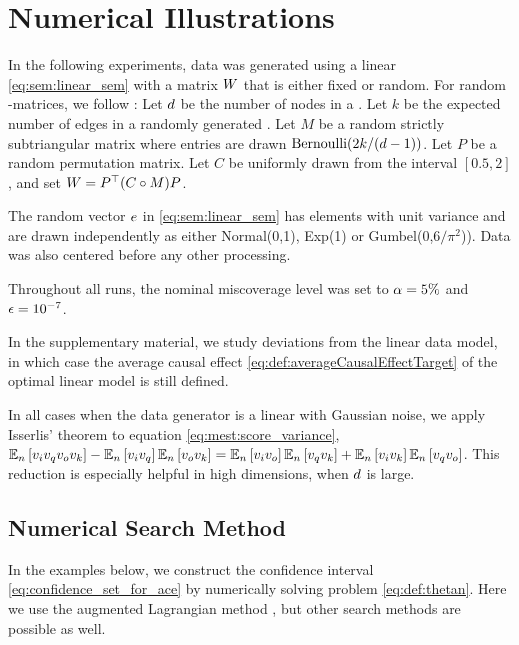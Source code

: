 \section{Numerical Illustrations}
\label{sec:numerics}

In the following experiments, data was generated using a linear \scm{} \eqref{eq:sem:linear_sem} with a matrix $W$ that is either fixed or random. For random \DAG{}-matrices, we follow \citet[section 4.1]{yu_daggnn_2019}: Let $d$ be the number of nodes in a \scm{}. Let $k$ be the expected number of edges in a randomly generated \DAG{}. Let $M$ be a random strictly subtriangular matrix where entries are drawn $\operatorname{Bernoulli}(2k/(d-1))$. Let $P$ be a random permutation matrix. Let $C$ be uniformly drawn from the interval $[0.5,2]$, and set $W=P^\top (C\circ M) P$.

The random vector $e$ in \eqref{eq:sem:linear_sem} has elements with unit variance and are drawn independently as either Normal(0,1), Exp(1) or Gumbel(0,$6/\pi^2$)). Data was also centered before any other processing.

Throughout all runs, the nominal miscoverage level was set to $\alpha=5\%$ and $\epsilon=10^{-7}$.

\begin{remark}
     In the supplementary material, we study deviations from the linear data model, in which case the average causal effect \eqref{eq:def:averageCausalEffectTarget} of the optimal linear model is still defined.
\end{remark}
\begin{remark}
     In all cases when the data generator is a linear \scm{} with Gaussian noise, we apply Isserlis' theorem to equation \eqref{eq:mest:score_variance}, $\mathbb{E}_n\left[ v_i v_q v_o v_k \right]-
          \mathbb{E}_n\left[ v_i v_q \right]\mathbb{E}_n\left[ v_o v_k \right] =
          \mathbb{E}_n\left[ v_i v_o \right]\mathbb{E}_n\left[ v_q v_k \right]
          +\mathbb{E}_n\left[ v_i v_k \right]\mathbb{E}_n\left[ v_q v_o \right]
     $. This reduction is especially helpful in high dimensions, when $d$ is large.
\end{remark}

\subsection{Numerical Search Method} \label{subsection:numerical_search}
In the examples below, we construct the confidence interval \eqref{eq:confidence_set_for_ace} by numerically solving problem \eqref{eq:def:thetan}. Here we use the augmented Lagrangian method \citep{nocedal_numerical_2006}, but other search methods are possible as well.

